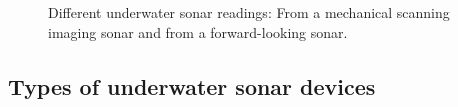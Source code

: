 \documentclass[final,5p,times]{elsarticle}
\begin{document}
\begin{figure}[t]
    \centering
    \caption{Different underwater sonar readings: 
    From a mechanical scanning imaging sonar and 
    from a forward-looking sonar.}
    \captionsetup{justification=justified}
    \label{fig:sonar_devices}
\end{figure}

\subsection{Types of underwater sonar devices}
\label{sonar:devices}
\end{document}
